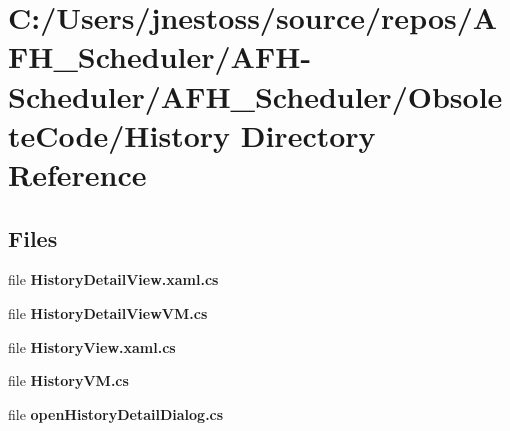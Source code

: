 \section{C\+:/\+Users/jnestoss/source/repos/\+A\+F\+H\+\_\+\+Scheduler/\+A\+F\+H-\/\+Scheduler/\+A\+F\+H\+\_\+\+Scheduler/\+Obsolete\+Code/\+History Directory Reference}
\label{dir_74ec2e7b3bedcb44badffb7d710ac739}
\subsection*{Files}
\begin{DoxyCompactItemize}
\item 
file \textbf{ History\+Detail\+View.\+xaml.\+cs}
\item 
file \textbf{ History\+Detail\+View\+V\+M.\+cs}
\item 
file \textbf{ History\+View.\+xaml.\+cs}
\item 
file \textbf{ History\+V\+M.\+cs}
\item 
file \textbf{ open\+History\+Detail\+Dialog.\+cs}
\end{DoxyCompactItemize}
